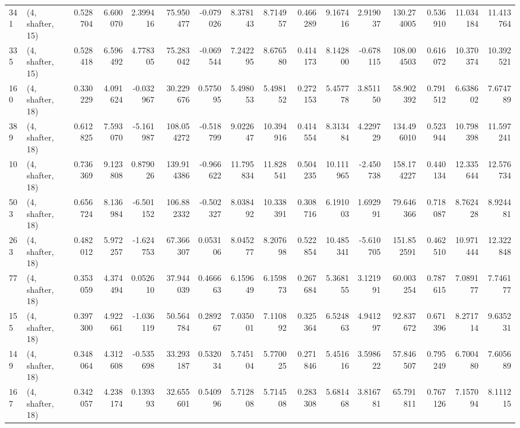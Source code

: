 \begin{tabular}{llrrrrrrrrrrrrrr}
341 &  (4, shafter, 15) &   0.528704 &   6.600070 &   2.399416 &    75.950477 &  -0.079026 &   8.378143 &   8.714957 &  0.466289 &   9.167416 &   2.919037 &   130.274005 &  0.536910 &  11.034184 &  11.413764 \\
335 &  (4, shafter, 15) &   0.528418 &   6.596492 &   4.778305 &    75.283042 &  -0.069544 &   7.242295 &   8.676580 &  0.414173 &   8.142800 &  -0.678115 &   108.004503 &  0.616072 &  10.370374 &  10.392521 \\
160 &  (4, shafter, 18) &   0.330229 &   4.091624 &  -0.032967 &    30.229676 &   0.575095 &   5.498053 &   5.498152 &  0.272153 &   5.457778 &   3.851150 &    58.902392 &  0.791512 &   6.638602 &   7.674789 \\
389 &  (4, shafter, 18) &   0.612825 &   7.593070 &  -5.161987 &   108.054272 &  -0.518799 &   9.022647 &  10.394916 &  0.414554 &   8.313484 &   4.229729 &   134.496010 &  0.523944 &  10.798398 &  11.597241 \\
10  &  (4, shafter, 18) &   0.736369 &   9.123808 &   0.879026 &   139.914386 &  -0.966622 &  11.795834 &  11.828541 &  0.504235 &  10.111965 &  -2.450738 &   158.174227 &  0.440134 &  12.335644 &  12.576734 \\
503 &  (4, shafter, 18) &   0.656724 &   8.136984 &  -6.501152 &   106.882332 &  -0.502327 &   8.038492 &  10.338391 &  0.308716 &   6.191003 &   1.692991 &    79.646366 &  0.718087 &   8.762428 &   8.924481 \\
263 &  (4, shafter, 18) &   0.482012 &   5.972257 &  -1.624753 &    67.366307 &   0.053106 &   8.045277 &   8.207698 &  0.522854 &  10.485341 &  -5.610705 &   151.852591 &  0.462510 &  10.971444 &  12.322848 \\
77  &  (4, shafter, 18) &   0.353059 &   4.374494 &   0.052610 &    37.944039 &   0.466663 &   6.159649 &   6.159873 &  0.267684 &   5.368155 &   3.121991 &    60.003254 &  0.787615 &   7.089177 &   7.746177 \\
155 &  (4, shafter, 18) &   0.397300 &   4.922661 &  -1.036119 &    50.564784 &   0.289267 &   7.035001 &   7.110892 &  0.325364 &   6.524863 &   4.941297 &    92.837672 &  0.671396 &   8.271714 &   9.635231 \\
149 &  (4, shafter, 18) &   0.348064 &   4.312608 &  -0.535698 &    33.293187 &   0.532034 &   5.745104 &   5.770025 &  0.271846 &   5.451616 &   3.598622 &    57.846507 &  0.795249 &   6.700480 &   7.605689 \\
167 &  (4, shafter, 18) &   0.342057 &   4.238174 &   0.139393 &    32.655601 &   0.540996 &   5.712808 &   5.714508 &  0.283308 &   5.681468 &   3.816781 &    65.791811 &  0.767126 &   7.157094 &   8.111215 \\

\end{tabular}
